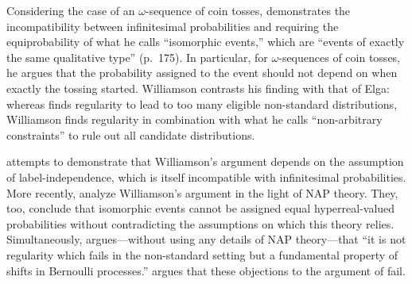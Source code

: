 Considering the case of an $\omega$-sequence of coin tosses, \citet{Williamson:2007} demonstrates the incompatibility between infinitesimal probabilities and requiring the equiprobability of what he calls ``isomorphic events,'' which are ``events of exactly the same qualitative type'' (p.~175). In particular, for $\omega$-sequences of coin tosses, he argues that the probability assigned to the event should not depend on when exactly the tossing started.
Williamson contrasts his finding with that of Elga: whereas \citet{Elga:2004} finds regularity to lead to too many eligible non-standard distributions, Williamson finds regularity in combination with what he calls ``non-arbitrary constraints'' to rule out all candidate distributions.

\citet{Weintraub:2008} attempts to demonstrate that Williamson's argument depends on the assumption of label-independence, which is itself incompatible with infinitesimal probabilities.
More recently, \citet{Benci_etal:2018} analyze Williamson's argument in the light of NAP theory. They, too, conclude that isomorphic events cannot be assigned equal hyper\-real-valued probabilities without contradicting the assumptions on which this theory relies.
Simultaneously, \citet{Howson:2017} argues---without using any details of NAP theory---that ``it is not regularity which fails in the non-standard setting but a fundamental property of shifts in Bernoulli processes.'' \citet{Parker:unpubl} argues that these objections to the argument of \citet{Williamson:2007} fail.

